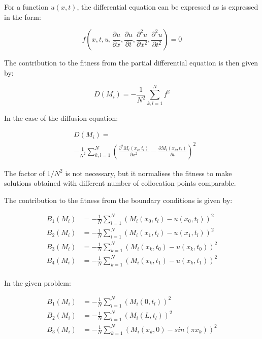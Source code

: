 \documentclass[multicolumn, 10pt]{extarticle}
\begin{document}
For a function $u(x, t)$, the differential equation can be expressed as is expressed in the form:

\begin{equation*}
	f \left( x, t, u, \frac{\partial u}{\partial x}, \frac{\partial u}{\partial t}, \frac{\partial^2 u }{\partial x^2}, \frac{\partial^2 u}{\partial t^2} \right) = 0
\end{equation*}


The contribution to the fitness from the partial differential equation is then given by:

\begin{equation*}
	D(M_{i}) = -\frac{1}{N^{2}}\sum_{k, l=1}^{N} f^2
\end{equation*}

In the case of the diffusion equation:

\begin{align*}
	 & D(M_{i}) =                                                                                                                                       \\
	 & - \frac{1}{N^{2}} \sum_{k, l=1}^{N} \left( \frac{\partial^2 M_i(x_k, t_l) }{\partial x^2} - \frac{\partial M_i(x_k, t_l)}{\partial t} \right) ^2
\end{align*}

The factor of $1/N^{2}$ is not necessary, but it normalises the fitness to make solutions obtained with different number of collocation points comparable.


The contribution to the fitness from the boundary conditions is given by:

\begin{align*}
	B_1(M_{i}) & = -\frac{1}{N} \sum_{l=1}^{N} \left( M_i(x_0, t_l)- u(x_0, t_l)\right) ^2 \\
	B_2(M_{i}) & = -\frac{1}{N} \sum_{l=1}^{N} (M_i(x_1, t_l)- u(x_1, t_l))^2              \\
	B_3(M_{i}) & = -\frac{1}{N} \sum_{k=1}^{N} (M_i(x_k, t_0)- u(x_k, t_0))^2              \\
	B_4(M_{i}) & = -\frac{1}{N} \sum_{k=1}^{N} (M_i(x_k, t_1)- u(x_k, t_1))^2              \\
\end{align*}

In the given problem:

\begin{align*}
	B_1(M_{i}) & = -\frac{1}{N} \sum_{l=1}^{N} \left( M_i(0, t_l)\right) ^2     \\
	B_2(M_{i}) & = -\frac{1}{N} \sum_{l=1}^{N} (M_i(L, t_l))^2                  \\
	B_3(M_{i}) & = -\frac{1}{N} \sum_{k=1}^{N} (M_i(x_k, 0) - sin(\pi x_{k}))^2 \\
\end{align*}
\end{document}

